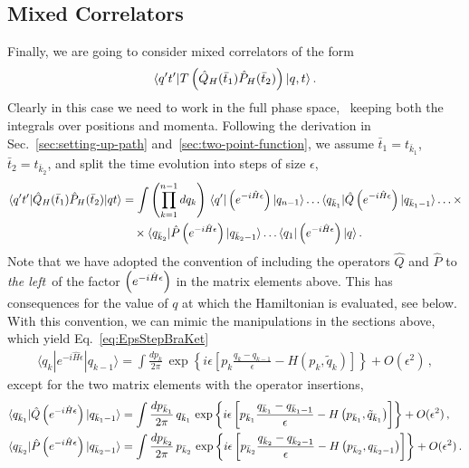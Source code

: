 \subsection{Mixed Correlators}
\label{sec:MixedCorrelators}

Finally, we are going to consider mixed correlators of the form
\begin{align}
  \label{eq:MixedCorrOne}
  \langle q't' | T\left(\hat{Q}_H(\bar{t}_1) \hat{P}_H(\bar{t}_2)\right)| q,t \rangle\, .
\end{align}
Clearly in this case we need to work in the full phase space, \ie\ keeping both the 
integrals over positions and momenta. 
Following the derivation in Sec.~\ref{sec:setting-up-path} and~\ref{sec:two-point-function}, 
we assume $\bar{t}_1=t_{\bar k_1}$, $\bar{t}_2=t_{\bar k_2}$, and split the time evolution 
into steps of size $\epsilon$, 
\begin{align}
  \langle q't' | \hat{Q}_H(\bar{t}_1) \hat{P}_H(\bar{t}_2)| qt \rangle 
    &= \int \left(\prod_{k=1}^{n-1}dq_k\right)\,
      \langle q' | \left(e^{-i \hat{H} \epsilon}\right) | q_{n-1} \rangle \dots \langle q_{\bar k_1} |\hat{Q}\left(e^{-i \hat{H} \epsilon}\right) | q_{\bar k_1 -1} \rangle \ldots \times \nonumber \\
    & \quad \times \langle q_{\bar k_2} |\hat{P}\left(e^{-i \hat{H} \epsilon}\right) | q_{\bar{k}_2-1} \rangle \ldots \langle q_1 |\left(e^{-i \hat{H} \epsilon}\right) | q \rangle\, .
\end{align}
Note that we have adopted the convention of including the operators $\hat{Q}$ and $\hat{P}$ to {\em the left}\ 
of the factor $\left(e^{-i \hat{H} \epsilon}\right)$ in the matrix elements above. This has consequences for the value of $q$ at which the 
Hamiltonian is evaluated, see below. With this convention, we can mimic the manipulations in the sections above, 
which yield Eq.~\eqref{eq:EpsStepBraKet}
\begin{align}
  \langle q_k | e^{-i\hat{H}\epsilon} | q_{k-1}\rangle = 
  \int \frac{dp_k}{2\pi}\, \exp\left\{i\epsilon \left[
  p_k \frac{q_k-q_{k-1}}{\epsilon} - H\left(p_k,\tilde{q}_k\right)
  \right]
  \right\} + O(\epsilon^2)\, ,
\end{align}
except for the two matrix elements with the operator insertions, 
\begin{align}
  \langle q_{\bar k_1} |\hat{Q}\left(e^{-i \hat{H} \epsilon}\right) | q_{\bar k_1 -1} \rangle &= 
    \int \frac{dp_{\bar k_1}}{2\pi}\, q_{\bar k_1}\, \exp\left\{i\epsilon \left[
    p_{\bar k_1} \frac{q_{\bar k_1}-q_{\bar k_1-1}}{\epsilon} - H\left(p_{\bar k_1},\tilde{q}_{\bar k_1}\right)
    \right]
    \right\} + O(\epsilon^2)\, , \\
  \label{eq:SkipABeat}  
  \langle q_{\bar k_2} |\hat{P}\left(e^{-i \hat{H} \epsilon}\right) | q_{\bar{k}_2-1} \rangle &=
    \int \frac{dp_{\bar k_2}}{2\pi}\, p_{\bar k_2}\, \exp\left\{i\epsilon \left[
    p_{\bar k_2} \frac{q_{\bar k_2}-q_{\bar k_2-1}}{\epsilon} - H\left(p_{\bar k_2},q_{\bar k_2-1}\right)
    \right]
    \right\} + O(\epsilon^2)\, .
\end{align}
